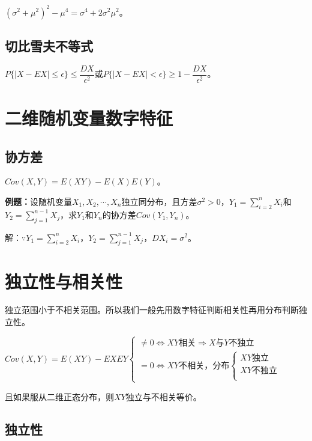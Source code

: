 \documentclass[UTF8, 12pt]{ctexart}
\begin{document}
$(\sigma^2+\mu^2)^2-\mu^4=\sigma^4+2\sigma^2\mu^2$。

\subsection{切比雪夫不等式}

$P\{\vert X-EX\vert\leqslant\epsilon\}\leqslant\dfrac{DX}{\epsilon^2}$或$P\{\vert X-EX\vert<\epsilon\}\geqslant1-\dfrac{DX}{\epsilon^2}$。

\section{二维随机变量数字特征}

\subsection{协方差}

$Cov(X,Y)=E(XY)-E(X)E(Y)$。

\textbf{例题：}设随机变量$X_1,X_2,\cdots,X_n$独立同分布，且方差$\sigma^2>0$，$Y_1=\sum\limits_{i=2}^nX_i$和$Y_2=\sum\limits_{j=1}^{n-1}X_j$，求$Y_1$和$Y_n$的协方差$Cov(Y_1,Y_n)$。

解：$\because Y_1=\sum\limits_{i=2}^nX_i$，$Y_2=\sum\limits_{j=1}^{n-1}X_j$，$DX_i=\sigma^2$。

\section{独立性与相关性}

独立范围小于不相关范围。所以我们一般先用数字特征判断相关性再用分布判断独立性。

$Cov(X,Y)=E(XY)-EXEY\left\{\begin{array}{l}
    \neq0\Leftrightarrow XY\text{相关}\Rightarrow X\text{与}Y\text{不独立} \\
    =0\Leftrightarrow XY\text{不相关，分布}\left\{\begin{array}{l}
        XY\text{独立} \\
        XY\text{不独立} \\
    \end{array}\right.
\end{array}\right.$

且如果服从二维正态分布，则$XY$独立与不相关等价。

\subsection{独立性}
\end{document}
